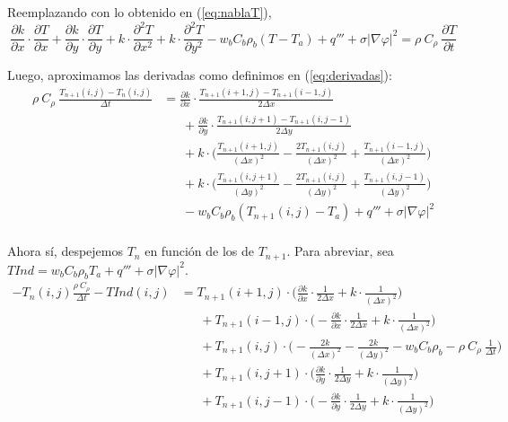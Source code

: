 \documentclass[a4paper]{article}
\begin{document}
Reemplazando con lo obtenido en (\ref{eq:nablaT}),
$$ \frac{\partial k}{\partial x} \cdot \frac{\partial T}{\partial x} + \frac{\partial k}{\partial y} \cdot \frac{\partial T}{\partial y} + k \cdot \frac{\partial^2 T}{\partial x^2} + k \cdot \frac{\partial^2 T}{\partial y^2} - w_b C_b \rho_b (T-T_a) + q''' + \sigma |\nabla \varphi|^2 = \rho \ C_\rho \ \frac{\partial T}{\partial t}$$

Luego, aproximamos las derivadas como definimos en (\ref{eq:derivadas}):\\
\begin{equation*}
\begin{aligned}
\rho \ C_\rho \ \frac{T_{n+1}(i,j) - T_n(i,j)}{\Delta t} &= \frac{\partial k}{\partial x} \cdot \frac{T_{n+1}(i+1,j) - T_{n+1}(i-1,j)}{2\Delta x} \\ & \ \ \ \ \ \ \  + \frac{\partial k}{\partial y} \cdot \frac{T_{n+1}(i,j+1) - T_{n+1}(i,j-1)}{2\Delta y} \\ & \ \ \ \ \ \ \ + k \cdot \bigg(\frac{T_{n+1}(i+1,j)}{(\Delta x)^2} - \frac{2 T_{n+1}(i,j)}{(\Delta x)^2} + \frac{T_{n+1}(i-1,j)}{(\Delta x)^2}\bigg) \\ & \ \ \ \ \ \ \  + k \cdot \bigg(\frac{T_{n+1}(i,j+1)}{(\Delta y)^2} - \frac{2 T_{n+1}(i,j)}{(\Delta y)^2} + \frac{T_{n+1}(i,j-1)}{(\Delta y)^2}\bigg) \\ & \ \ \ \ \ \ \  -  w_b C_b \rho_b (T_{n+1}(i,j)-T_a) + q''' + \sigma |\nabla \varphi|^2\\
\end{aligned}
\end{equation*}

\bigskip
Ahora sí, despejemos $T_n$ en función de los de $T_{n+1}$. Para abreviar, sea $TInd = w_b C_b \rho_b T_a + q''' + \sigma |\nabla \varphi|^2$. \\

\begin{equation*}
\begin{aligned}
- T_n(i,j) \frac{\rho \ C_\rho}{\Delta t} - TInd(i,j) &= T_{n+1}(i+1,j) \cdot \bigg(\frac{\partial k}{\partial x} \cdot \frac{1}{2\Delta x} +  k \cdot\frac{1}{(\Delta x)^2}\bigg) \\ & \ \ \ \ \ \ \ + T_{n+1}(i-1,j) \cdot \bigg(-\frac{\partial k}{\partial x} \cdot \frac{1}{2\Delta x} + k \cdot\frac{1}{(\Delta x)^2}\bigg) \\ & \ \ \ \ \ \ \ + T_{n+1}(i,j) \cdot \bigg(-\frac{2k}{(\Delta x)^2} -\frac{2k}{(\Delta y)^2} - w_b C_b \rho_b - \rho \ C_\rho \ \frac{1}{\Delta t}\bigg) \\ & \ \ \ \ \ \ \ + T_{n+1}(i,j+1) \cdot \bigg(\frac{\partial k}{\partial y} \cdot \frac{1}{2\Delta y} + k \cdot\frac{1}{(\Delta y)^2}\bigg) \\ & \ \ \ \ \ \ \  + T_{n+1}(i,j-1) \cdot \bigg(-\frac{\partial k}{\partial y} \cdot \frac{1}{2\Delta y} + k \cdot\frac{1}{(\Delta y)^2}\bigg)
\end{aligned}
\end{equation*}
\end{document}
